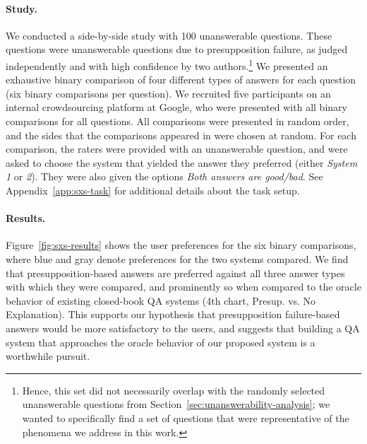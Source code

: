 \documentclass[11pt,a4paper]{article}
\begin{document}
\paragraph{Study.} We conducted a side-by-side study with 100 unanswerable questions. These questions were unanswerable questions due to presupposition failure, as judged independently and with high confidence by two authors.\footnote{Hence, this set did not necessarily overlap with the randomly selected unanswerable questions from Section~\ref{sec:unanswerability-analysis}; we wanted to specifically find a set of questions that were representative of the phenomena we address in this work.} We presented an exhaustive binary comparison of four different types of answers for each question (six binary comparisons per question). We recruited five participants on an internal crowdsourcing platform at Google, who were presented with all binary comparisons for all questions. All comparisons were presented in random order, and the sides that the comparisons appeared in were chosen at random. For each comparison, the raters were provided with an unanswerable question, and were asked to choose the system that yielded the answer they preferred (either \textit{System 1} or \textit{2}). They were also given the options \textit{Both answers are good/bad}. See Appendix~\ref{app:sxs-task} for additional details about the task setup. 

\paragraph{Results.}
Figure~\ref{fig:sxs-results} shows the user preferences for the six binary comparisons, where blue and gray denote preferences for the two systems compared. We find that presupposition-based answers are preferred against all three answer types with which they were compared, and prominently so when compared to the oracle behavior of existing closed-book QA systems (4th chart, Presup. vs. No Explanation). This supports our hypothesis that presupposition failure-based answers would be more satisfactory to the users, and suggests that building a QA system that approaches the oracle behavior of our proposed system is a worthwhile pursuit.
\end{document}
